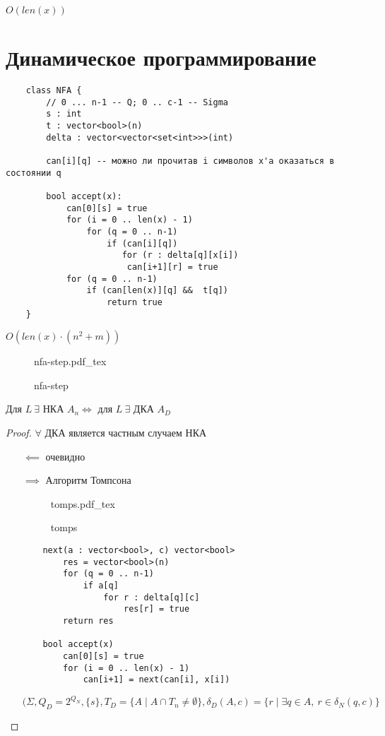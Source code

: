 \documentclass{book}
\renewcommand\O{\ensuremath{\emptyset}}
\theoremstyle{definition}
\newcommand{\incfig}[1]{%
    \def\svgwidth{\columnwidth}
    {#1.pdf_tex}
}
\begin{document}
$O(len(x))$
\section{Динамическое программирование}

\begin{verbatim}
    class NFA {
        // 0 ... n-1 -- Q; 0 .. c-1 -- Sigma
        s : int
        t : vector<bool>(n)
        delta : vector<vector<set<int>>>(int)

        can[i][q] -- можно ли прочитав i символов x'a оказаться в состоянии q

        bool accept(x):
            can[0][s] = true
            for (i = 0 .. len(x) - 1)
                for (q = 0 .. n-1)
                    if (can[i][q])
                       for (r : delta[q][x[i])
                        can[i+1][r] = true
            for (q = 0 .. n-1)
                if (can[len(x)][q] &&  t[q])
                    return true
    }   
\end{verbatim}

$O\left( len(x) \cdot  (n^2 + m) \right) $


\begin{figure}[!ht]
    \centering
    \incfig{nfa-step}
    \caption{nfa-step}
    \label{fig:nfa-step}
\end{figure}

\begin{statement}
    Для $L\ \exists $ НКА $A_n \iff $ для $L\ \exists $ ДКА $A_D$
\end{statement}
\begin{proof}
    $\forall $ ДКА является частным случаем НКА

    \begin{itemize}
        \item [$\impliedby $] очевидно
        \item [$\implies $] Алгоритм Томпсона

\begin{figure}[!ht]
    \centering
    \incfig{tomps}
    \caption{tomps}
    \label{fig:tomps}
\end{figure}

\begin{verbatim}
    next(a : vector<bool>, c) vector<bool> 
        res = vector<bool>(n)
        for (q = 0 .. n-1)
            if a[q]
                for r : delta[q][c]
                    res[r] = true
        return res

    bool accept(x)
        can[0][s] = true
        for (i = 0 .. len(x) - 1)
            can[i+1] = next(can[i], x[i])
\end{verbatim}

$(\Sigma, Q_D = 2^{Q_N}, \{s\}, T_D = \{A\mid A\cap T_n \neq \O \} , \delta_D(A,c) = \{r \mid \exists q\in A,\ r\in \delta_N(q,c)\}$
    \end{itemize}
\end{proof}
\end{document}
